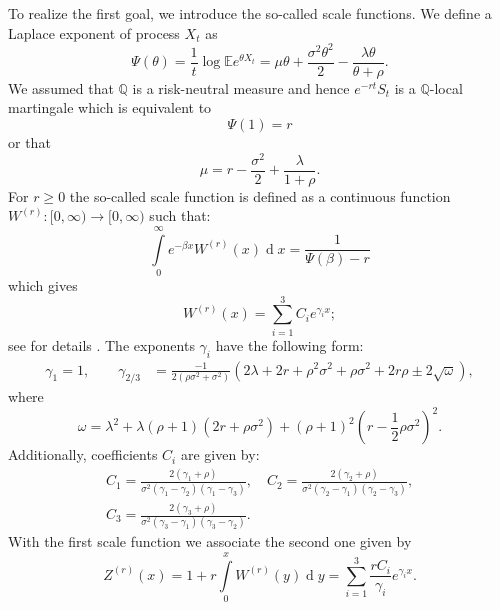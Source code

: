 \documentclass[10pt,a4paper]{amsart}
\def\E{{\mathbb{E}}}
\def\Q{{\mathbb{Q}}}
\def \R{{{\rm I{\!}\rm R}}}
\newcommand{\dx}{\operatorname{d}\!}
\def\E{{\mathbb E}} \def\PP{\mc P} \def\Z{{\mathbb Z}} \def\R{{\mathbb R}}
\begin{document}
	To realize the first goal, we introduce the so-called scale functions.
	We define a Laplace exponent of process $X_t$ as
	\begin{equation*}
		\Psi(\theta) = \frac{1}{t}\log\E e^{\theta X_t}=
		\mu\theta + \frac{\sigma^2\theta^2}{2} - \frac{\lambda\theta}{\theta + \rho}.
	\end{equation*}
	We assumed that $\Q$ is a risk-neutral measure and hence $e^{-rt}S_t$ is a $\Q$-local martingale which is equivalent to
	\begin{equation*}
		\label{Psi1}\Psi(1) = r
	\end{equation*}
	or that
	\begin{equation*}
		\mu = r - \frac{\sigma^2}{2} +  \frac{\lambda}{1+\rho}.
	\end{equation*}
	For $r \geq 0$ the so-called scale function is defined as a continuous function $W^{(r)}:[ 0,\infty ) \rightarrow [ 0,\infty ) $ such that:
	\begin{equation*}
		\int\limits_0^\infty e^{-\beta x}W^{(r)}(x)\dx x = \frac{1}{\Psi(\beta)-r}
	\end{equation*}
	which gives
	\begin{equation}\label{W_sum}
		W^{(r)}(x) = \sum_{i=1}^3 C_i e^{\gamma_i x};
	\end{equation}
	see for details \cite{ZP&PS}.
	The exponents $\gamma_i$ have the following form:
	\begin{align}
		\gamma_1 = 1, \qquad
		\gamma_{2/3} &= \frac{-1}{2(\rho\sigma^2 + \sigma^2)}\left(2\lambda + 2r + \rho^2\sigma^2 + \rho\sigma^2 + 2r\rho \pm 2\sqrt{\omega}\right), \label{eta2}
	\end{align}
	where
	\begin{equation*}
		\omega = \lambda^2 + \lambda (\rho+1)(2r+\rho\sigma^2) + (\rho+1)^2 \left(r - \frac{1}{2}\rho\sigma^2\right)^2.
	\end{equation*}
	Additionally, coefficients $C_i$ are given by:
	\begin{align*}
		C_1 = \frac{2(\gamma_1+\rho)}{\sigma^2(\gamma_1 - \gamma_2)(\gamma_1 - \gamma_3)},\quad %
		C_2 = \frac{2(\gamma_2+\rho)}{\sigma^2(\gamma_2 - \gamma_1)(\gamma_2 - \gamma_3)},
		\\
		C_3 = \frac{2(\gamma_3+\rho)}{\sigma^2(\gamma_3 - \gamma_1)(\gamma_3 - \gamma_2)}.
	\end{align*}
	With the first scale function we associate the second one given by
	\begin{equation}\label{Z_def}
		Z^{(r)}(x) = 1 + r\int\limits_{0}^{x} W^{(r)}(y)\dx y=\sum_{i=1}^3 \frac{rC_i}{\gamma_i} e^{\gamma_i x}.
	\end{equation}
	
\end{document}

